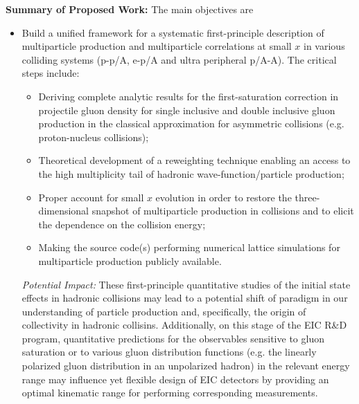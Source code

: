 \vspace{0.5em}
\noindent
{\bf Summary of Proposed Work:}
The main objectives  are 
\begin{itemize}




	\item Build a unified framework for a systematic 
		first-principle description of multiparticle production and
		multiparticle correlations at small $x$ in 
		various colliding systems (p-p/A, e-p/A and ultra peripheral p/A-A). The critical steps include:
		\begin{itemize}
			\item Deriving complete analytic results for the first-saturation correction 
		in projectile gluon density for single inclusive and double inclusive 
		gluon production in the classical approximation for 
		asymmetric collisions (e.g. proton-nucleus collisions);
			\item Theoretical  development of a reweighting technique
		enabling an access to the high multiplicity tail of 
		hadronic wave-function/particle production; 
			\item Proper account for  small $x$ evolution in order to restore the
		three-dimensional snapshot of multiparticle production in collisions
		and to elicit the dependence on the collision energy;
			\item Making the source code(s) performing numerical lattice 
				simulations for multiparticle production publicly available. 
		\end{itemize}

		{\it Potential Impact:} 
		These first-principle quantitative studies of the initial state effects in hadronic collisions 
		may lead to a potential shift of paradigm in our understanding of 
		particle production and, specifically,  the origin of collectivity in hadronic collisins. Additionally, 
		on this stage of 
		the EIC R\&D program, quantitative  predictions for the observables sensitive to 
		gluon saturation or to various gluon distribution functions  
		(e.g. the linearly polarized gluon distribution in an unpolarized hadron)  
		in the relevant energy range 
		may influence yet flexible design of EIC detectors by providing an
		optimal kinematic range for performing corresponding measurements.  


\end{itemize}
